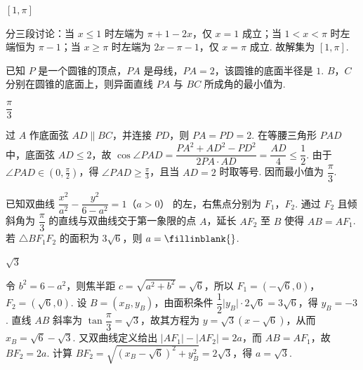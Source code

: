 \documentclass[UTF8,a4paper,oneside,11pt]{ctexbook}
\begin{document}
\begin{answer}
\([1,\pi]\)
\end{answer}

\begin{solution}
分三段讨论：当 \(x\le1\) 时左端为 \(\pi+1-2x\)，仅 \(x=1\) 成立；当 \(1<x<\pi\) 时左端恒为 \(\pi-1\)；当 \(x\ge\pi\) 时左端为 \(2x-\pi-1\)，仅 \(x=\pi\) 成立. 故解集为 \([1,\pi]\).
\end{solution}

\begin{problem}
已知 \(P\) 是一个圆锥的顶点，\(PA\) 是母线，\(PA=2\)，该圆锥的底面半径是 \(1\). \(B\)，\(C\) 分别在圆锥的底面上，则异面直线 \(PA\) 与 \(BC\) 所成角的最小值为\fillinblank{}.
\end{problem}

\begin{answer}
\(\dfrac{\pi}{3}\)
\end{answer}

\begin{solution}
过 \(A\) 作底面弦 \(AD\parallel BC\)，并连接 \(PD\)，则 \(PA=PD=2\). 在等腰三角形 \(PAD\) 中，底面弦 \(AD\le2\)，故
\(\cos\angle PAD=\dfrac{PA^2+AD^2-PD^2}{2PA\cdot AD}=\dfrac{AD}{4}\le\dfrac12\).
由于 \(\angle PAD\in(0,\frac\pi2)\)，得 \(\angle PAD\ge\frac\pi3\)，且当 \(AD=2\) 时取等号. 因而最小值为 \(\dfrac\pi3\).
\end{solution}

\begin{problem}
已知双曲线 \(\dfrac{x^2}{a^2}-\dfrac{y^2}{6-a^2}=1\)（\(a>0\)） 的左，右焦点分别为 \(F_1\)，\(F_2\). 通过 \(F_2\) 且倾斜角为 \(\dfrac\pi3\) 的直线与双曲线交于第一象限的点 \(A\)，延长 \(AF_2\) 至 \(B\) 使得 \(AB=AF_1\). 若 \(\triangle BF_1F_2\) 的面积为 \(3\sqrt6\)，则 \(a=\fillinblank{}\).
\end{problem}

\begin{answer}
\(\sqrt3\)
\end{answer}

\begin{solution}
令 \(b^2=6-a^2\)，则焦半距 \(c=\sqrt{a^2+b^2}=\sqrt6\)，所以 \(F_1=(-\sqrt6,0)\)，\(F_2=(\sqrt6,0)\). 设 \(B=(x_B,y_B)\)，由面积条件
\(\dfrac12\lvert y_B\rvert\cdot2\sqrt6=3\sqrt6\)，得 \(y_B=-3\). 直线 \(AB\) 斜率为 \(\tan\dfrac\pi3=\sqrt3\)，故其方程为 \(y=\sqrt3(x-\sqrt6)\)，从而 \(x_B=\sqrt6-\sqrt3\). 又双曲线定义给出 \(\lvert AF_1\rvert-\lvert AF_2\rvert=2a\)，而 \(AB=AF_1\)，故 \(BF_2=2a\). 计算 \(BF_2=\sqrt{(x_B-\sqrt6)^2+y_B^2}=2\sqrt3\)，得 \(a=\sqrt3\).
\end{solution}
\end{document}
